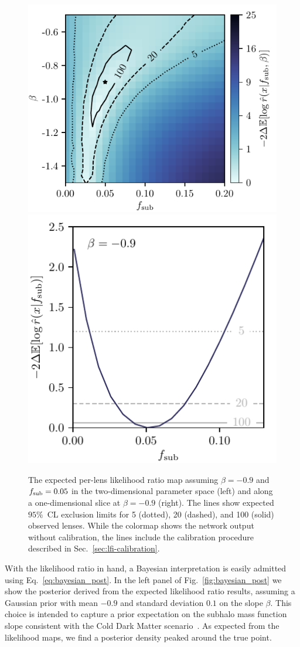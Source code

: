 \documentclass[twocolumn]{aastex62}
\begin{document}
\begin{figure}[t!]
  \centering
  \includegraphics[height=0.4\textwidth]{figures/expected_likelihood_map}%
  \hspace*{0.075\textwidth}%
  \includegraphics[height=0.4\textwidth]{figures/expected_likelihood_slice}%
  \hspace*{0.052\textwidth}%
  \caption{The expected per-lens likelihood ratio map assuming $\beta = -0.9$ and $f_{\mathrm{sub}} = 0.05$ in the two-dimensional parameter space (left) and along a one-dimensional slice at $\beta = -0.9$ (right). The lines show expected $95\%$~CL exclusion limits for 5 (dotted), 20 (dashed), and 100 (solid) observed lenses. While the colormap shows the network output without calibration, the lines include the calibration procedure described in Sec.~\ref{sec:lfi-calibration}.}
  \label{fig:expected_likelihood}
\end{figure}

With the likelihood ratio in hand, a Bayesian interpretation is easily admitted using Eq.~\eqref{eq:bayesian_post}. In the left panel of Fig.~\ref{fig:bayesian_post} we show the posterior derived from the expected likelihood ratio results, assuming a Gaussian prior with mean $-0.9$ and standard deviation $0.1$ on the slope $\beta$. This choice is intended to capture a prior expectation on the subhalo mass function slope consistent with the Cold Dark Matter scenario~\citep{0809.0898,0802.2265}. As expected from the likelihood maps, we find a posterior density peaked around the true point.
\end{document}
